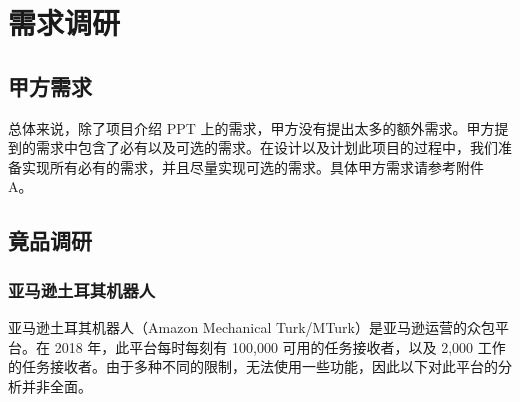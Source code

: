 \section{需求调研}

\subsection{甲方需求}

总体来说，除了项目介绍 PPT 上的需求，甲方没有提出太多的额外需求。甲方提到的需求中包含了必有以及可选的需求。在设计以及计划此项目的过程中，我们准备实现所有必有的需求，并且尽量实现可选的需求。具体甲方需求请参考附件 A。

\newpage

\subsection{竟品调研}

\subsubsection{亚马逊土耳其机器人}

亚马逊土耳其机器人（Amazon Mechanical Turk/MTurk）是亚马逊运营的众包平台。在 2018 年，此平台每时每刻有 100,000 可用的任务接收者，以及 2,000 工作的任务接收者。由于多种不同的限制，无法使用一些功能，因此以下对此平台的分析并非全面。

